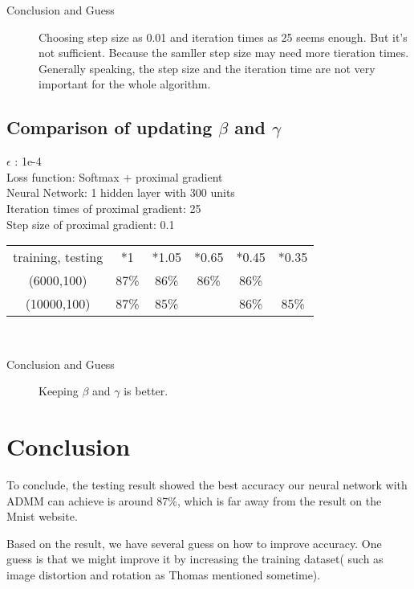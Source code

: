 \documentclass{article}
\begin{document}
\begin{description}
\item[Conclusion and Guess] Choosing step size as 0.01 and iteration times as 25 seems enough. But it's not sufficient. Because the samller step size may need more tieration times. Generally speaking, the step size and the iteration time are not very important for the whole algorithm.
\end{description}

\subsection{Comparison of updating $\beta$ and $\gamma$}
\begin{center}
$\epsilon$ : 1e-4\\
Loss function: Softmax + proximal gradient\\
Neural Network: 1 hidden layer with 300 units\\
Iteration times of proximal gradient: 25 \\
Step size of proximal gradient: 0.1 \\
	\begin{tabular}{c c c c c c}
	\hline
		{training, testing} & *1 & *1.05 & *0.65 & *0.45 & *0.35 \\
		(6000,100) & 87\% & 86\% & 86\% & 86\% & \\
		(10000,100) & 87\% & 85\% & & 86\%& 85\%\\
	\hline
	\end{tabular}\\	
\end{center}

\begin{description}
\item[Conclusion and Guess] Keeping $\beta$ and $\gamma$ is better.
\end{description}

\section{Conclusion}
To conclude, the testing result showed the best accuracy our neural network with ADMM can achieve is around 87\%, which is far away from the result on the Mnist website. 

Based on the result,  we have several guess on how to improve accuracy.  One guess is that we might improve it by increasing the training dataset( such as image distortion and rotation as Thomas mentioned sometime). \\
\end{document}
